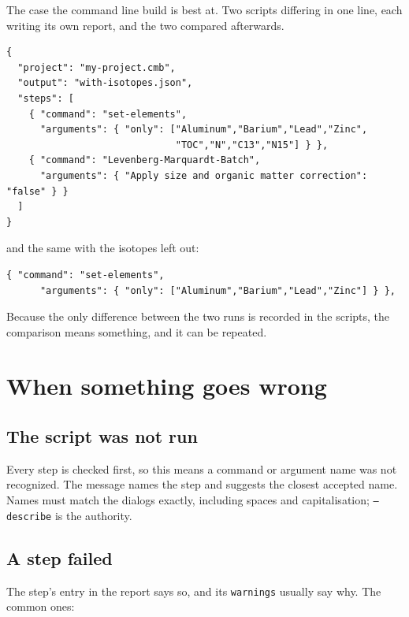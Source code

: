 \documentclass[11pt,a4paper]{report}
\begin{document}
The case the command line build is best at. Two scripts differing in one line,
each writing its own report, and the two compared afterwards.

\begin{lstlisting}[language=scriptjson]
{
  "project": "my-project.cmb",
  "output": "with-isotopes.json",
  "steps": [
    { "command": "set-elements",
      "arguments": { "only": ["Aluminum","Barium","Lead","Zinc",
                              "TOC","N","C13","N15"] } },
    { "command": "Levenberg-Marquardt-Batch",
      "arguments": { "Apply size and organic matter correction": "false" } }
  ]
}
\end{lstlisting}

and the same with the isotopes left out:

\begin{lstlisting}[language=scriptjson]
    { "command": "set-elements",
      "arguments": { "only": ["Aluminum","Barium","Lead","Zinc"] } },
\end{lstlisting}

Because the only difference between the two runs is recorded in the scripts,
the comparison means something, and it can be repeated.

\chapter{When something goes wrong}
\label{ch:troubleshooting}

\section{The script was not run}

Every step is checked first, so this means a command or argument name was not
recognized. The message names the step and suggests the closest accepted name.
Names must match the dialogs exactly, including spaces and capitalisation;
\texttt{--describe} is the authority.

\section{A step failed}

The step's entry in the report says so, and its \texttt{warnings} usually say
why. The common ones:
\end{document}
